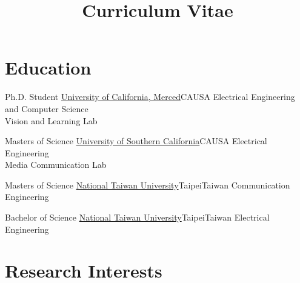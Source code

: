 \documentclass[11pt,letterpaper,sans]{moderncv} %
\title{Curriculum Vitae}
\begin{document}
\makecvtitle %

\vspace{-10mm}
\section{Education}
{Ph.D. Student}
{\href{http://ucmerced.edu/}{University of California, Merced}}{CA}{USA}
{
Electrical Engineering and Computer Science \\
Vision and Learning Lab 
}

{Masters of Science}
{\href{http://www.usc.edu//}{University of Southern California}}{CA}{USA}
{Electrical Engineering\\
Media Communication Lab }


{Masters of Science}
{\href{http://www.ntu.edu.tw/english/}{National Taiwan University}}{Taipei}{Taiwan}
{Communication Engineering}


{Bachelor of Science}
{\href{http://www.ntu.edu.tw/english/}{National Taiwan University}}{Taipei}{Taiwan}
{Electrical Engineering}


\section{Research Interests}



\end{document}
